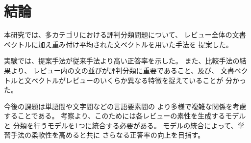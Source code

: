 \section{結論} \label{sec:Conclusion}

本研究では、多カテゴリにおける評判分類問題について、
レビュー全体の文書ベクトルに加え重み付け平均された文ベクトルを用いた手法を
提案した。

実験では、提案手法が従来手法\cite{fujitani15}より高い正答率を示した。
また、比較手法の結果より、
レビュー内の文の並びが評判分類に重要であること、及び、
文書ベクトルと文ベクトルがレビューのいくらか異なる特徴を捉えていることが
分かった。

今後の課題は単語間や文字間などの言語要素間の
より多様で複雑な関係を考慮することである。
考察より、このためには各レビューの素性を生成するモデルと
分類を行うモデルを1つに統合する必要がある。
モデルの統合によって、学習手法の柔軟性を高めると共に
さらなる正答率の向上を目指す。

